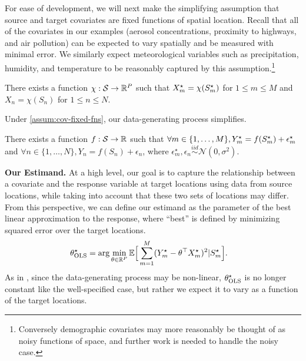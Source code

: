 For ease of development, we will next make the simplifying assumption that source and target covariates are fixed functions of spatial location. Recall that all of the covariates in our examples (aerosol concentrations, proximity to highways, and air pollution) can be expected to vary spatially and be measured with minimal error. We similarly expect meteorological variables such as precipitation, humidity, and temperature to be reasonably captured by this assumption.\footnote{Conversely demographic covariates may more reasonably be thought of as noisy functions of space, and further work is needed to handle the noisy case.}
\begin{assumption}\label{assum:cov-fixed-fns}
    There exists a function $\chi: \mathcal{S} \to \mathbb{R}^P$ such that $X^{\star}_m =\chi(S^{\star}_m)$ for $1 \leq m \leq M$ and $X_n = \chi(S_n)$ for $1 \leq n \leq N$.
\end{assumption}

Under \cref{assum:cov-fixed-fns}, our data-generating process simplifies.
\begin{assumption}\label{assum:test-train-dgp}
    There exists a function $f : \mathcal{S} \to \mathbb{R}$ such that $\forall m \in \{1,\ldots,M\}, Y^{\star}_m = f(S^{\star}_m) + \epsilon^{\star}_m$ and $\forall n \in \{1,\ldots,N\}, Y_n = f(S_n) + \epsilon_n$, where
    $\epsilon^{\star}_m, \epsilon_n \stackrel{iid}{\sim} \mathcal{N}(0,\sigma^2)$.
\end{assumption}

\textbf{Our Estimand.}
At a high level, our goal is to capture the relationship between a covariate and the response variable at target locations using data from source locations, while taking into account that these two sets of locations may differ. From this perspective, we can define our estimand as the parameter of the best linear approximation to the response, where ``best'' is defined by minimizing squared error over the target locations.
\begin{align}
    \label{eqn:test-set-least-squares}
    \theta^{\star}_{\text{OLS}} &= \arg\min_{\theta \in \mathbb{R}^{P}}\mathbb{E}\Big[\sum_{m=1}^M(Y^{\star}_m - \theta^{\top}X^{\star}_m)^2|S^{\star}_m\Big].
\end{align}
As in \citet{white_1980_usingleastsquares,buja_models_2019}, since the data-generating process may be non-linear, $\theta^{\star}_{\text{OLS}}$ is no longer constant like the well-specified case, but rather we expect it to vary as a function of the target locations.


